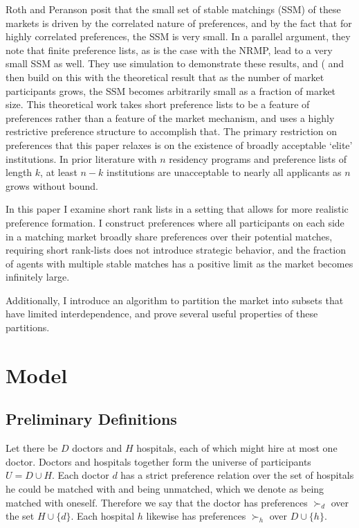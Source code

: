 \documentclass[WP]{AEA}
\begin{document}
Roth and Peranson posit that the small set of stable matchings (SSM) of these markets is driven by the correlated nature of preferences, and by the fact that for highly correlated preferences, the SSM is very small.  In a parallel argument, they note that finite preference lists, as is the case with the NRMP, lead to a very small SSM as well.  They use simulation to demonstrate these results, and (\cite{Immorlica2005} and then \cite{Kojima2009} build on this with the theoretical result that as the number of market participants grows, the SSM becomes arbitrarily small as a fraction of market size. This theoretical work takes short preference lists to be a feature of preferences rather than a feature of the market mechanism, and uses a highly restrictive preference structure to accomplish that. 
The primary restriction on preferences that this paper relaxes is on the existence of broadly acceptable `elite' institutions. In prior literature with $n$ residency programs and preference lists of length $k$,  at least $n-k$ institutions are unacceptable to nearly all applicants as $n$ grows without bound.  

In this paper I examine short rank lists in a setting that allows for more realistic preference formation. I construct preferences where all participants on each side in a matching market broadly share preferences over their potential matches, requiring short rank-lists does not introduce strategic behavior, and the fraction of agents with multiple stable matches has a positive limit as the market becomes infinitely large.

Additionally, I introduce an algorithm to partition the market into subsets that have limited interdependence, and prove several useful properties of these partitions.

\section{Model}
\subsection{Preliminary Definitions}

Let there be $D$ doctors and $H$ hospitals, each of which might hire at most one doctor. Doctors and hospitals together form the universe of participants $U = D \cup H$.  Each doctor $d$ has a strict preference relation over the set of hospitals he could be matched with and being unmatched, which we denote as being matched with oneself. Therefore we say that the doctor has preferences $\succ_{d}$ over the set $H \cup \{d\}$. Each hospital $h$ likewise has preferences $\succ_h$ over $D \cup \{h\}$. 
\end{document}

